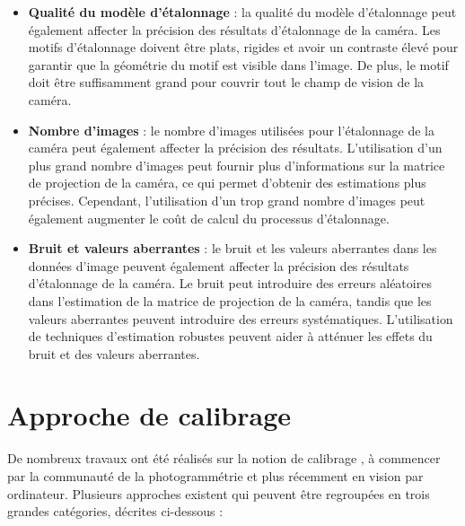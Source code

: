 \begin{itemize}
  	\item \textbf{Qualité du modèle d’étalonnage} : la qualité du modèle d’étalonnage peut également affecter la précision des résultats d’étalonnage de la caméra. Les motifs d’étalonnage doivent être plats, rigides et avoir un contraste élevé pour garantir que la géométrie du motif est visible dans l’image. De plus, le motif doit être suffisamment grand pour couvrir tout le champ de vision de la caméra.\\
  	
  	\item \textbf{Nombre d'images} :  le nombre d’images utilisées pour l’étalonnage de la caméra peut également affecter la précision des résultats. L’utilisation d’un plus grand nombre d’images peut fournir plus d’informations sur la matrice de projection de la caméra, ce qui permet d’obtenir des estimations plus précises. Cependant, l’utilisation d’un trop grand nombre d’images peut également augmenter le coût de calcul du processus d’étalonnage. \\
  	
  	\item \textbf{Bruit et valeurs aberrantes} :  le bruit et les valeurs aberrantes dans les données d’image peuvent également affecter la précision des résultats d’étalonnage de la caméra. Le bruit peut introduire des erreurs aléatoires dans l’estimation de la matrice de projection de la caméra, tandis que les valeurs aberrantes peuvent introduire des erreurs systématiques. L’utilisation de techniques d’estimation robustes peuvent aider à atténuer les effets du bruit et des valeurs aberrantes.
  \end{itemize}
   
  
  
  
  
  
  
  
  
  
  
  \newpage
  
  \section{Approche de calibrage}
  
  De nombreux travaux ont été réalisés sur la notion de calibrage , à commencer par la communauté de la photogrammétrie et plus récemment en vision par ordinateur.
  Plusieurs approches existent qui peuvent être regroupées en trois grandes catégories, décrites ci-dessous : 
  
